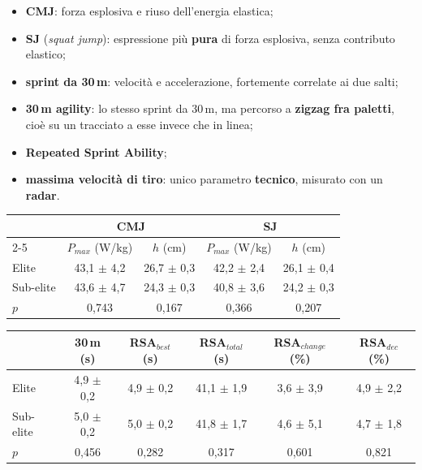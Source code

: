 \begin{itemize}
  \item \textbf{CMJ}: forza esplosiva e riuso dell'energia elastica;
  \item \textbf{SJ} (\textit{squat jump}): espressione più \textbf{pura} di forza esplosiva, senza
    contributo elastico;
  \item \textbf{sprint da 30\,m}: velocità e accelerazione, fortemente correlate ai due salti;
  \item \textbf{30\,m agility}: lo stesso sprint da 30\,m, ma percorso a \textbf{zigzag fra
    paletti}, cioè su un tracciato a esse invece che in linea;
  \item \textbf{Repeated Sprint Ability};
  \item \textbf{massima velocità di tiro}: unico parametro \textbf{tecnico}, misurato con un
    \textbf{radar}.
\end{itemize}

\begin{table}[htbp]
  \centering
  \small
  \renewcommand{\arraystretch}{1.3}
  \begin{tabularx}{\textwidth}{|X|c|c|c|c|}
    \hline
    & \multicolumn{2}{c|}{\textbf{CMJ}} & \multicolumn{2}{c|}{\textbf{SJ}} \\
    \cline{2-5}
    & $P_{max}$ (W/kg) & $h$ (cm) & $P_{max}$ (W/kg) & $h$ (cm) \\
    \hline
    Elite & 43,1 $\pm$ 4,2 & 26,7 $\pm$ 0,3 & 42,2 $\pm$ 2,4 & 26,1 $\pm$ 0,4 \\
    \hline
    Sub-elite & 43,6 $\pm$ 4,7 & 24,3 $\pm$ 0,3 & 40,8 $\pm$ 3,6 & 24,2 $\pm$ 0,3 \\
    \hline
    $p$ & 0,743 & 0,167 & 0,366 & 0,207 \\
    \hline
  \end{tabularx}
\end{table}

\begin{table}[htbp]
  \centering
  \small
  \renewcommand{\arraystretch}{1.3}
  \begin{tabularx}{\textwidth}{|X|c|c|c|c|c|}
    \hline
    & \textbf{30\,m} (s) & \textbf{RSA$_{best}$} (s) & \textbf{RSA$_{total}$} (s) &
      \textbf{RSA$_{change}$} (\%) & \textbf{RSA$_{dec}$} (\%) \\
    \hline
    Elite & 4,9 $\pm$ 0,2 & 4,9 $\pm$ 0,2 & 41,1 $\pm$ 1,9 & 3,6 $\pm$ 3,9 & 4,9 $\pm$ 2,2 \\
    \hline
    Sub-elite & 5,0 $\pm$ 0,2 & 5,0 $\pm$ 0,2 & 41,8 $\pm$ 1,7 & 4,6 $\pm$ 5,1 & 4,7 $\pm$ 1,8 \\
    \hline
    $p$ & 0,456 & 0,282 & 0,317 & 0,601 & 0,821 \\
    \hline
  \end{tabularx}
\end{table}

